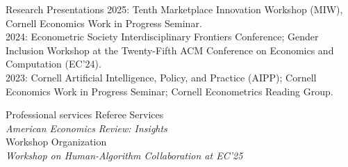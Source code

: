 \documentclass{resume} %
\newcommand{\itab}[1]{\hspace{0em}\rlap{#1}}
\begin{document}



\begin{rSection}{Research Presentations}
2025: Tenth Marketplace Innovation Workshop (MIW), Cornell Economics Work in Progress Seminar. \\
2024: Econometric Society Interdisciplinary Frontiers Conference; Gender Inclusion Workshop at the Twenty-Fifth ACM Conference on Economics and Computation (EC'24). \\
2023: Cornell Artificial Intelligence, Policy, and Practice (AIPP); Cornell Economics Work in Progress Seminar; Cornell Econometrics Reading Group. 
\end{rSection}


\begin{rSection}{Professional services}
Referee Services\\
\-\hspace{1em}\emph{American Economics Review: Insights} \\
Workshop Organization \\
\-\hspace{1em}\emph{Workshop on Human-Algorithm Collaboration at EC'25}
\end{rSection}

\end{document}

